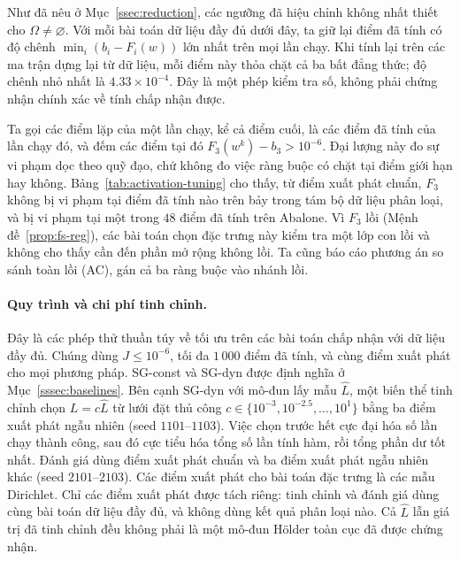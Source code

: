 Như đã nêu ở Mục~\ref{ssec:reduction}, các ngưỡng đã hiệu chỉnh không nhất thiết cho
$\Omega\ne\varnothing$. Với mỗi bài toán dữ liệu đầy đủ dưới đây, ta giữ lại điểm đã tính có độ chênh
$\min_i(b_i-F_i(w))$ lớn nhất trên mọi lần chạy. Khi tính lại trên các ma trận dựng lại từ dữ liệu, mỗi
điểm này thỏa chặt cả ba bất đẳng thức; độ chênh nhỏ nhất là
$4.33\times10^{-4}$. Đây là một phép kiểm tra số, không phải chứng nhận chính xác về tính chấp nhận được.

Ta gọi các điểm lặp của một lần chạy, kể cả điểm cuối, là các điểm đã tính của lần chạy đó, và đếm các điểm tại đó
$F_3(w^k)-b_3>10^{-6}$. Đại lượng này đo sự vi phạm dọc theo quỹ đạo, chứ không đo việc
ràng buộc có chặt tại điểm giới hạn hay không. Bảng~\ref{tab:activation-tuning} cho thấy, từ
điểm xuất phát chuẩn, $F_3$ không bị vi phạm tại điểm đã tính nào trên bảy trong tám bộ dữ liệu
phân loại, và bị vi phạm tại một trong $48$ điểm đã tính trên Abalone. Vì $F_3$ lồi
(Mệnh đề~\ref{prop:fs-reg}), các bài toán chọn đặc trưng này kiểm tra một lớp con lồi và
không cho thấy cần đến phần mở rộng không lồi. Ta cũng báo cáo phương án so sánh toàn lồi
(AC), gán cả ba ràng buộc vào nhánh lồi.

\paragraph*{Quy trình và chi phí tinh chỉnh.}
Đây là các phép thử thuần túy về tối ưu trên các bài toán chấp nhận với dữ liệu đầy đủ.
Chúng dùng $J\le10^{-6}$, tối đa $1\,000$ điểm đã tính, và cùng
điểm xuất phát cho mọi phương pháp. SG-const và SG-dyn được định nghĩa ở Mục~\ref{sssec:baselines}. Bên cạnh SG-dyn với
mô-đun lấy mẫu $\widehat L$, một biến thể tinh chỉnh chọn $L=c\widehat L$ từ lưới đặt thủ công
$c\in\{10^{-3},10^{-2.5},\ldots,10^1\}$ bằng ba điểm xuất phát
ngẫu nhiên (seed $1101$--$1103$). Việc chọn trước hết cực đại hóa số
lần chạy thành công, sau đó cực tiểu hóa tổng số lần tính hàm, rồi tổng phần dư tốt nhất.
Đánh giá dùng điểm xuất phát chuẩn và ba điểm xuất phát ngẫu nhiên khác
(seed $2101$--$2103$). Các điểm xuất phát cho bài toán đặc trưng là các mẫu Dirichlet.
Chỉ các điểm xuất phát được tách riêng: tinh chỉnh và đánh giá dùng cùng
bài toán dữ liệu đầy đủ, và không dùng kết quả phân loại nào. Cả
$\widehat L$ lẫn giá trị đã tinh chỉnh đều không phải là một mô-đun H\"older toàn cục đã được chứng nhận.

